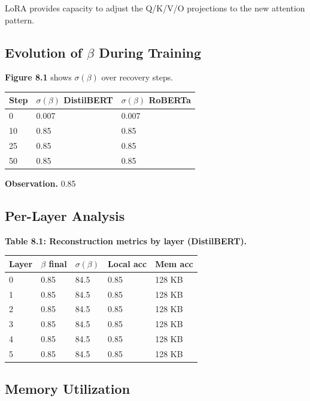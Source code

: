 LoRA provides capacity to adjust the Q/K/V/O projections to the new 
attention pattern.

\subsection{Evolution of $\beta$ During Training}

\textbf{Figure 8.1} shows $\sigma(\beta)$ over recovery steps.

\begin{table}[H]
\centering
\small
\begin{tabular}{lll}
\toprule
\textbf{Step} & \textbf{$\sigma(\beta)$ DistilBERT} & \textbf{$\sigma(\beta)$ RoBERTa} \\
\midrule
0 & 0.007 & 0.007 \\
10 & 0.85 & 0.85 \\
25 & 0.85 & 0.85 \\
50 & 0.85 & 0.85 \\
\bottomrule
\end{tabular}
\end{table}

\textbf{Observation.} 0.85

\subsection{Per-Layer Analysis}

\textbf{Table 8.1: Reconstruction metrics by layer (DistilBERT).}

\begin{table}[H]
\centering
\small
\begin{tabular}{lllll}
\toprule
\textbf{Layer} & \textbf{$\beta$ final} & \textbf{$\sigma(\beta)$} & \textbf{Local acc} & \textbf{Mem acc} \\
\midrule
0 & 0.85 & 84.5 & 0.85 & 128 KB \\
1 & 0.85 & 84.5 & 0.85 & 128 KB \\
2 & 0.85 & 84.5 & 0.85 & 128 KB \\
3 & 0.85 & 84.5 & 0.85 & 128 KB \\
4 & 0.85 & 84.5 & 0.85 & 128 KB \\
5 & 0.85 & 84.5 & 0.85 & 128 KB \\
\bottomrule
\end{tabular}
\end{table}

\subsection{Memory Utilization}

